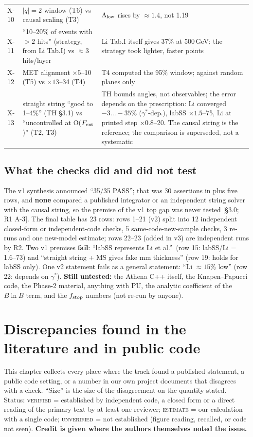 \documentclass[11pt,a4paper]{article}
\newcommand{\EST}{\textsc{estimate}}
\newcommand{\UNV}{\textsc{unverified}}
\newcommand{\VER}{\textsc{verified}}
\DeclareRobustCommand{\file}[1]{\path{#1}}
\newcommand{\gst}{\gamma^*}
\newcommand{\src}[1]{{\color{mid}[#1]}}
\begin{document}
{\begin{longtable}{@{}L{0.7cm}L{5.4cm}L{10.2cm}@{}}
X-10 & $|q|=2$ window (T6) vs causal scaling (T3) & $\Lambda_{\rm low}$ rises by $\approx1.4$, not 1.19\\
X-11 & ``10--20\% of events with $>2$ hits'' (strategy, from Li Tab.I) vs $\approx3$ hits/layer & Li Tab.I itself gives 37\% at 500\,GeV; the strategy took lighter, faster points\\
X-12 & MET alignment $\times5$--10 (T5) vs $\times13$--34 (T4) & T4 computed the 95\% window; against random planes only\\
X-13 & straight string ``good to 1--4\%'' (TH \S3.1) vs ``uncontrolled at O($F_{\rm ext}$)'' (T2, T3) & TH bounds angles, not observables; the error depends on the prescription: Li converged $-3\ldots-35\%$ ($\gst$-dep.), labSS $\times1.5$--75, Li at printed step $\times0.8$--20. The causal string is the reference; the comparison is superseded, not a systematic\\
\end{longtable}
}

\subsection{What the checks did and did not test}
The v1 synthesis announced ``35/35 PASS''; that was 30 assertions in \file{S_spotchecks.py} plus five rows, and \textbf{none} compared a published integrator or an independent string solver with the causal string, so the premise of the v1 top gap was never tested \src{\S3.0; R1 A-3}. The final table has 23 rows: rows 1--21 (v2) split into 12 independent closed-form or independent-code checks, 5 same-code-new-sample checks, 3 re-runs and one new-model estimate; rows 22--23 (added in v3) are independent runs by R2. Two v1 premises \textbf{fail}: ``labSS represents Li et al.''\ (row 15: labSS/Li = 1.6--73) and ``straight string + MS gives fake mm thickness'' (row 19: holds for labSS only). One v2 statement fails as a general statement: ``Li $\approx15\%$ low'' (row 22: depends on $\gst$). \textbf{Still untested:} the Athena C++ itself, the Knapen--Papucci code, the Phase-2 material, anything with PU, the analytic coefficient of the $B\ln B$ term, and the $f_{\rm stop}$ numbers (not re-run by anyone).

\section{Discrepancies found in the literature and in public code}\label{sec:disc}
This chapter collects every place where the track found a published statement, a public code setting, or a number in our own project documents that disagrees with a check. ``Size'' is the size of the disagreement on the quantity stated. Status: \VER{} = established by independent code, a closed form or a direct reading of the primary text by at least one reviewer; \EST{} = our calculation with a single code; \UNV{} = not established (figure reading, recalled, or code not seen). \textbf{Credit is given where the authors themselves noted the issue.}
\end{document}
